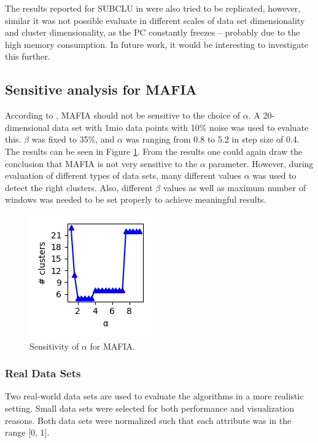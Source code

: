 The results reported for SUBCLU in \cite{subclu} were also tried to be replicated, however, similar it was not possible evaluate in different scales of data set dimensionality and cluster dimensionality, as the PC constantly freezes -- probably due to the high memory consumption. In future work, it would be interesting to investigate this further.

\subsection{Sensitive analysis for MAFIA}
According to \cite{mafia}, MAFIA should not be sensitive to the choice of $\alpha$. A 20-dimensional data set with 1mio data points with 10\% noise was used to evaluate this. $\beta$ was fixed to 35\%, and $\alpha$ was ranging from 0.8 to 5.2 in step size of 0.4. The results can be seen in Figure \ref{fig:sensitivity_alpha}. From the results one could again draw the conclusion that MAFIA is not very sensitive to the $\alpha$ parameter. However, during evaluation of different types of data sets, many different values $\alpha$ was used to detect the right clusters. Also, different $\beta$ values as well as maximum number of windows was needed to be set properly to achieve meaningful results.
\begin{figure}[H]
    \vspace*{-0.5cm}
    \centering
    \includegraphics[scale=0.45]{figures/sensitivity_alpha.png}
    \caption{Sensitivity of $\alpha$ for MAFIA.}
    \label{fig:sensitivity_alpha}
\end{figure}

\subsubsection{Real Data Sets}
Two real-world data sets are used to evaluate the algorithms in a more realistic setting. Small data sets were selected for both performance and visualization reasons. Both data sets were normalized such that each attribute was in the range [0, 1].

